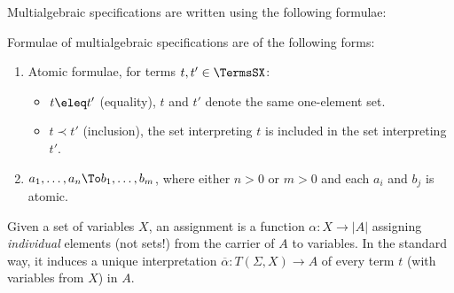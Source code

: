 Multialgebraic specifications are written using the following formulae:
%
\begin{definition}\label{def:masen}
Formulae of multialgebraic specifications are of the following forms:
\begin{enumerate}\MyLPar
\item Atomic formulae, for terms $t, t' \in \TermsSX$:
\begin{itemize}\MyLPar
\item $t \eleq  t'$ (equality), $t$ and $t'$ denote the same one-element set.
\item $t \prec t'$ (inclusion), the set interpreting $t$ is included in
the set interpreting $t'$.
\end{itemize}
\item $a_1 , \ldots ,a_n \To b_1 , \ldots ,b_m$, where either $n>0$ or $m>0$ and
each $a_i$ and $b_j$ is atomic.
\end{enumerate}
\end{definition}
%
Given a set of variables $X$, an assignment is a function $\alpha: X \to |A|$ 
assigning {\em individual} elements (not sets!) from the carrier of $A$ to
variables. In the standard way, it induces a unique
interpretation $\overline{\alpha}: T(\Sigma,X) \to A$ of every term $t$
(with variables from $X$) in
$A$.
%
 
